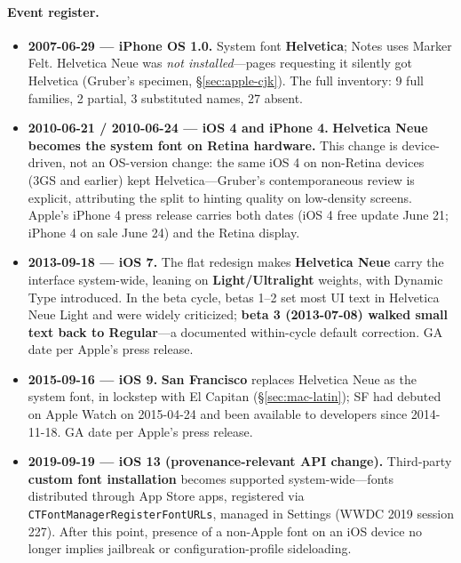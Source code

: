 \documentclass[10pt,a4paper]{article}
\newcommand{\code}[1]{\texttt{#1}}
\begin{document}
\paragraph{Event register.}
\begin{itemize}[leftmargin=1.2em,itemsep=2pt]
\item \textbf{2007-06-29 --- iPhone OS 1.0.} System font \textbf{Helvetica}; Notes uses
Marker Felt. Helvetica Neue was \emph{not installed}---pages requesting it silently got
Helvetica (Gruber's specimen, \S\ref{sec:apple-cjk}). The full inventory: 9 full
families, 2 partial, 3 substituted names, 27 absent.\cite{ca-gruber,ca-gruber-2,i-gruber07}
\item \textbf{2010-06-21 / 2010-06-24 --- iOS 4 and iPhone 4.} \textbf{Helvetica Neue
becomes the system font on Retina hardware.} This change is device-driven, not an
OS-version change: the same iOS 4 on non-Retina devices (3GS and earlier) kept
Helvetica---Gruber's contemporaneous review is explicit, attributing the split to
hinting quality on low-density screens. Apple's iPhone 4 press release carries both
dates (iOS 4 free update June 21; iPhone 4 on sale June 24) and the Retina
display.\cite{i-gruber4,i-iphone4pr}
\item \textbf{2013-09-18 --- iOS 7.} The flat redesign makes \textbf{Helvetica Neue}
carry the interface system-wide, leaning on \textbf{Light/Ultralight} weights, with
Dynamic Type introduced. In the beta cycle, betas 1--2 set most UI text in Helvetica
Neue Light and were widely criticized; \textbf{beta 3 (2013-07-08) walked small text
back to Regular}---a documented within-cycle default correction. GA date per Apple's
press release.\cite{i-ios7pr,i-typographica,i-fortune}
\item \textbf{2015-09-16 --- iOS 9.} \textbf{San Francisco} replaces Helvetica Neue as
the system font, in lockstep with El Capitan (\S\ref{sec:mac-latin}); SF had debuted on
Apple Watch on 2015-04-24 and been available to developers since 2014-11-18. GA date
per Apple's press release.\cite{i-ios9pr,m-sf}
\item \textbf{2019-09-19 --- iOS 13 (provenance-relevant API change).} Third-party
\textbf{custom font installation} becomes supported system-wide---fonts distributed
through App Store apps, registered via \code{CTFontManagerRegisterFontURLs}, managed in
Settings (WWDC 2019 session 227). After this point, presence of a non-Apple font on an
iOS device no longer implies jailbreak or configuration-profile
sideloading.\cite{i-ios13,i-ios13-2,i-ios13-3}
\end{itemize}
\end{document}
